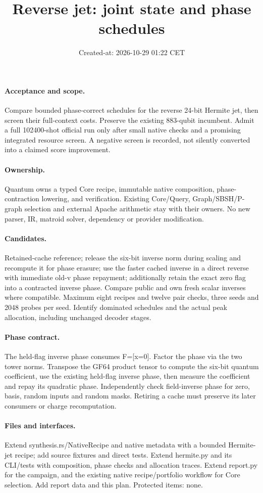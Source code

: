 \documentclass{article}
\title{Reverse jet: joint state and phase schedules}
\date{Created-at: 2026-10-29 01:22 CET}
\begin{document}
\maketitle
\paragraph{Acceptance and scope.} Compare bounded phase-correct schedules for
the reverse 24-bit Hermite jet, then screen their full-context costs. Preserve
the existing 883-qubit incumbent. Admit a full 102400-shot official run only
after small native checks and a promising integrated resource screen. A negative
screen is recorded, not silently converted into a claimed score improvement.
\paragraph{Ownership.} Quantum owns a typed Core recipe, immutable native
composition, phase-contraction lowering, and verification. Existing Core/Query,
Graph/SBSH/P-graph selection and external Apache arithmetic stay with their
owners. No new parser, IR, matroid solver, dependency or provider modification.
\paragraph{Candidates.} Retained-cache reference; release the six-bit inverse
norm during scaling and recompute it for phase erasure; use the faster cached
inverse in a direct reverse with immediate old-v phase repayment; additionally
retain the exact zero flag into a contracted inverse phase. Compare public and
own fresh scalar inverses where compatible. Maximum eight recipes and twelve
pair checks, three seeds and 2048 probes per seed. Identify dominated schedules
and the actual peak allocation, including unchanged decoder stages.
\paragraph{Phase contract.} The held-flag inverse phase consumes F=[x=0].
Factor the phase via the two tower norms. Transpose the GF64 product tensor to
compute the six-bit quantum coefficient, use the existing held-flag inverse
phase, then measure the coefficient and repay its quadratic phase. Independently
check field-inverse phase for zero, basis, random inputs and random masks.
Retiring a cache must preserve its later consumers or charge recomputation.
\paragraph{Files and interfaces.} Extend synthesis.rs/NativeRecipe and native
metadata with a bounded Hermite-jet recipe; add source fixtures and direct tests.
Extend hermite.py and its CLI/tests with composition, phase checks and allocation
traces. Extend report.py for the campaign, and the existing native recipe/portfolio
workflow for Core selection. Add report data and this plan. Protected items: none.
\end{document}
